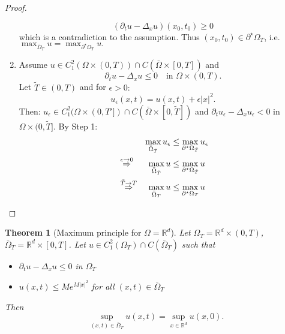 \documentclass{report}
\theoremstyle{tommy}
\newtheorem{thm}[defn]{Theorem}
\begin{document}
\begin{proof}
\begin{enumerate}[label=Step \arabic*)]
      \[(\partial_t u - \Delta_x u)(x_0, t_0) \ge 0\]
      which is a contradiction to the assumption. Thus \((x_0, t_0) \in \partial^\star \Omega_T\), i.e. \(\max_{\bar \Omega_T} u = \max_{\partial^\star \Omega_T} u.\)
      \item Assume \(u \in C_1^2(\Omega \times (0,T)) \cap C(\bar \Omega \times [0,T])\) and 
      \[\partial_t u - \Delta_x u \le 0 \quad \text{in } \Omega \times (0,T).\]
      Let \(\tilde T \in (0,T)\) and for \(\epsilon > 0:\)
      \[u_\epsilon(x,t) = u(x,t) + \epsilon |x|^2.\]
      Then: \(u_\epsilon \in C_1^2(\Omega \times (0,T']) \cap C(\bar \Omega \times [0, \tilde T])\) and \(\partial_t  u_\epsilon - \Delta_x  u_\epsilon < 0\) in \(\Omega \times (0,\tilde T]\). By Step 1:
      \begin{align*}
        &&\max_{\bar \Omega_{\tilde T}} u_\epsilon &\le \max_{\partial^\star \Omega_{\tilde T}} u_\epsilon \\
        &\overset{\epsilon \to 0}{\Rightarrow} &\max_{\bar \Omega_{\tilde T}} u &\le \max_{\partial^\star \Omega_{\tilde T}} u \\
        &\overset{\tilde T \to T}{\Rightarrow} &\max_{\bar \Omega_T} u &\le \max_{\partial^\star \Omega_T} u \qedhere
      \end{align*}
    \end{enumerate}
  \end{proof}

  \begin{thm}[Maximum principle for \(\Omega = \mathbb{R}^d\)]
    Let \(\Omega_T = \mathbb{R}^d \times (0,T)\), \(\bar \Omega_T = \mathbb{R}^d \times [0,T]\). Let \(u \in C_1^2(\Omega_T) \cap C(\bar \Omega_T)\) such that 
    \begin{itemize}
      \item \(\partial_t u - \Delta_x u \le 0\) in \(\Omega_T\)
      \item \(u(x,t) \le M e^{M|x|^2}\) for all \((x,t) \in \bar \Omega_T\)
    \end{itemize}
    Then \[\sup_{(x,t) \in \bar \Omega_T} u(x,t) = \sup_{x \in \mathbb{R}^d} u(x,0).\]
  \end{thm}
\end{document}
